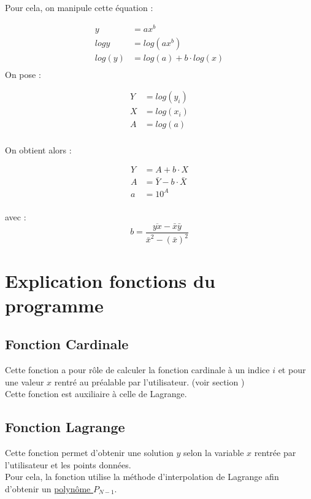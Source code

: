 \documentclass[12pt,french,titlepage]{article}
\begin{document}
	Pour cela, on manipule cette équation :
	
	\begin{align*}
		y&=ax^b\\
		log y&=log(ax^b)\\
		log(y)&=log(a)+b\cdot log(x)\\
	\end{align*}
	On pose :
	
	\begin{align*}
	Y&=log(y_i)\\
	X&=log(x_i)\\
	A&=log(a)\\
	\end{align*}
	
	On obtient alors :
	
	\begin{align*}
	Y&=A+b\cdot X\\
	A&=\bar{Y}-b\cdot \bar{X}\\
	a&=10^A\\
	\end{align*}
	
	avec :
	\begin{equation*}
		b=\frac{\overline{yx}-\bar{x}\bar{y}}{\bar{x}^2-(\bar{x})^2}
	\end{equation*}
	
	
	\section{Explication fonctions du programme}
	
	\subsection{Fonction Cardinale}
	
	
	\medskip
	Cette fonction a pour rôle de calculer la fonction cardinale à un indice $i$ et pour une valeur $x$ rentré au préalable par l'utilisateur. (voir section ) \\
	Cette fonction est auxiliaire à celle de Lagrange.\\
	\subsection{Fonction Lagrange}
	
	
	\medskip
	Cette fonction permet d'obtenir une solution $y$ selon la variable $x$ rentrée par l'utilisateur et les points données.\\
	Pour cela, la fonction utilise la méthode d'interpolation de Lagrange afin d'obtenir un \hyperref[lagrange]{polynôme $P_{N-1}$}.
\end{document}

